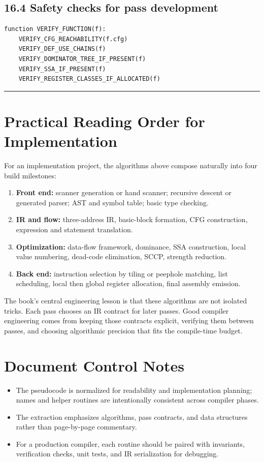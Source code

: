 \documentclass[10pt,letterpaper]{article}
\begin{document}
\subsection*{16.4 Safety checks for pass development}

\begin{verbatim}
function VERIFY_FUNCTION(f):
    VERIFY_CFG_REACHABILITY(f.cfg)
    VERIFY_DEF_USE_CHAINS(f)
    VERIFY_DOMINATOR_TREE_IF_PRESENT(f)
    VERIFY_SSA_IF_PRESENT(f)
    VERIFY_REGISTER_CLASSES_IF_ALLOCATED(f)
\end{verbatim}

\medskip\hrule\medskip

\clearpage
\section{Practical Reading Order for Implementation}

For an implementation project, the algorithms above compose naturally into four build milestones:

\begin{enumerate}
\item \textbf{Front end:} scanner generation or hand scanner; recursive descent or generated parser; AST and symbol table; basic type checking.
\item \textbf{IR and flow:} three-address IR, basic-block formation, CFG construction, expression and statement translation.
\item \textbf{Optimization:} data-flow framework, dominance, SSA construction, local value numbering, dead-code elimination, SCCP, strength reduction.
\item \textbf{Back end:} instruction selection by tiling or peephole matching, list scheduling, local then global register allocation, final assembly emission.
\end{enumerate}

The book's central engineering lesson is that these algorithms are not isolated tricks. Each pass chooses an IR contract for later passes. Good compiler engineering comes from keeping those contracts explicit, verifying them between passes, and choosing algorithmic precision that fits the compile-time budget.

\clearpage
\section*{Document Control Notes}
{}
\begin{itemize}
\item The pseudocode is normalized for readability and implementation planning; names and helper routines are intentionally consistent across compiler phases.
\item The extraction emphasizes algorithms, pass contracts, and data structures rather than page-by-page commentary.
\item For a production compiler, each routine should be paired with invariants, verification checks, unit tests, and IR serialization for debugging.
\end{itemize}
\end{document}
